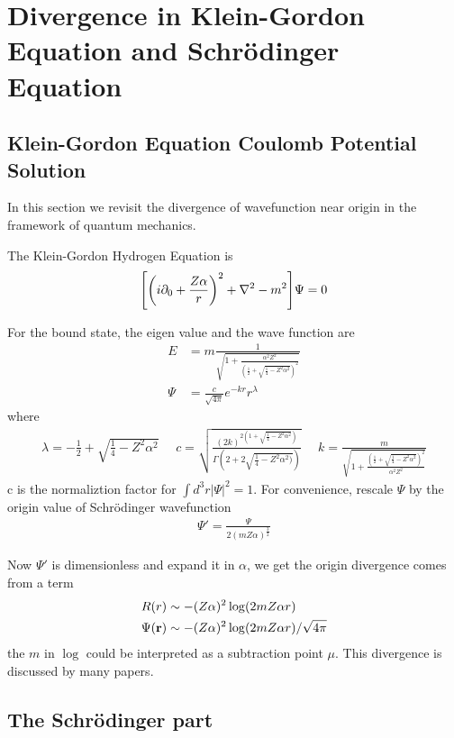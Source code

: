 \documentclass[aps,prd,preprint,showkeys,notitlepage,10pt]{revtex4-1}
\renewcommand{\a}{\alpha}
\begin{document}
\section{Divergence in Klein-Gordon Equation and Schr\"odinger Equation\label{sec:qm}}
\subsection{Klein-Gordon Equation Coulomb Potential Solution}
In this section we revisit the divergence of wavefunction near origin in the framework of quantum mechanics.

The Klein-Gordon Hydrogen Equation is
\begin{align}
	\bqty{\pqty{i\partial_0+\frac{Z\alpha}{r}}^2+\nabla^2-m^2}\Psi=0
\end{align}

For the bound state, the eigen value and the wave function are\cite{Greiner2000}
\begin{align}
	E    & =m\frac{1}{\sqrt{1+\frac{\alpha^2 Z^2}{(\frac{1}{2}+\sqrt{\frac{1}{4}-Z^2\alpha^2})^2}}} \\
	\Psi & =\frac{c}{\sqrt{4\pi}}e^{-kr}r^\lambda
\end{align}
where
\begin{align}
	\lambda=-\frac{1}{2}+\sqrt{\frac{1}{4}-Z^2\alpha^2}\ \ \ \ \ \
	c=\sqrt{\frac{(2k)^{2(1+\sqrt{\frac{1}{4}-Z^2\alpha^2})}}{\Gamma(2+2\sqrt{\frac{1}{4}-Z^2\alpha^2)})}}\ \ \ \ \ \
	k=\frac{m}{\sqrt{1+\frac{(\frac{1}{2}+\sqrt{\frac{1}{4}-Z^2\alpha^2})^2}{\alpha^2Z^2}}}
\end{align}
c is the normaliztion factor for $\int d^3r|\Psi|^2=1$. For convenience, rescale $\Psi$ by the origin value of Schr\"odinger wavefunction
\begin{align}
	\Psi '=\frac{\Psi}{2(mZ\alpha)^\frac{3}{2}}
\end{align}

Now $\Psi '$ is dimensionless and expand it in $\alpha$, we get the origin divergence comes from a term
\begin{align}
	R(r)         & \sim-(Z\alpha)^2\log(2m Z \a r)             \\
	\Psi(\vb{r}) & \sim-(Z\alpha)^2\log(2m Z \a r)/\sqrt{4\pi}
\end{align}
the $m$ in $\log$ could be interpreted as a subtraction point $\mu$. This divergence is discussed by many papers\cite{Chen2007,Chen2009}.

\subsection{The Schr\"odinger part}
\end{document}
